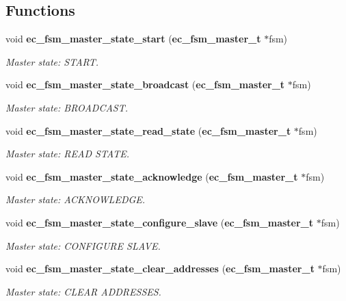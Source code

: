\subsection*{\-Functions}
\begin{DoxyCompactItemize}
\item 
void {\bf ec\-\_\-fsm\-\_\-master\-\_\-state\-\_\-start} ({\bf ec\-\_\-fsm\-\_\-master\-\_\-t} $\ast$fsm)
\begin{DoxyCompactList}\small\item\em \-Master state\-: \-S\-T\-A\-R\-T. \end{DoxyCompactList}\item 
void {\bf ec\-\_\-fsm\-\_\-master\-\_\-state\-\_\-broadcast} ({\bf ec\-\_\-fsm\-\_\-master\-\_\-t} $\ast$fsm)
\begin{DoxyCompactList}\small\item\em \-Master state\-: \-B\-R\-O\-A\-D\-C\-A\-S\-T. \end{DoxyCompactList}\item 
void {\bf ec\-\_\-fsm\-\_\-master\-\_\-state\-\_\-read\-\_\-state} ({\bf ec\-\_\-fsm\-\_\-master\-\_\-t} $\ast$fsm)
\begin{DoxyCompactList}\small\item\em \-Master state\-: \-R\-E\-A\-D \-S\-T\-A\-T\-E. \end{DoxyCompactList}\item 
void {\bf ec\-\_\-fsm\-\_\-master\-\_\-state\-\_\-acknowledge} ({\bf ec\-\_\-fsm\-\_\-master\-\_\-t} $\ast$fsm)
\begin{DoxyCompactList}\small\item\em \-Master state\-: \-A\-C\-K\-N\-O\-W\-L\-E\-D\-G\-E. \end{DoxyCompactList}\item 
void {\bf ec\-\_\-fsm\-\_\-master\-\_\-state\-\_\-configure\-\_\-slave} ({\bf ec\-\_\-fsm\-\_\-master\-\_\-t} $\ast$fsm)
\begin{DoxyCompactList}\small\item\em \-Master state\-: \-C\-O\-N\-F\-I\-G\-U\-R\-E \-S\-L\-A\-V\-E. \end{DoxyCompactList}\item 
void {\bf ec\-\_\-fsm\-\_\-master\-\_\-state\-\_\-clear\-\_\-addresses} ({\bf ec\-\_\-fsm\-\_\-master\-\_\-t} $\ast$fsm)
\begin{DoxyCompactList}\small\item\em \-Master state\-: \-C\-L\-E\-A\-R \-A\-D\-D\-R\-E\-S\-S\-E\-S. \end{DoxyCompactList}\item 

\end{DoxyCompactItemize}
